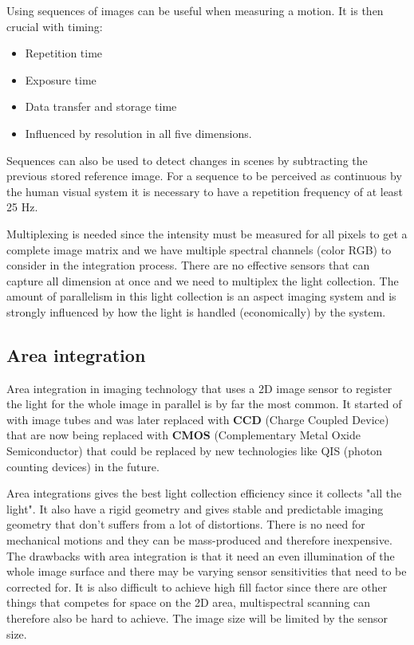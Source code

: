 Using sequences of images can be useful when measuring a motion. It is then crucial with timing:
\begin{itemize}
 	\item Repetition time
 	\item Exposure time
 	\item Data transfer and storage time
 	\item Influenced by resolution in all five dimensions. 
 \end{itemize} 
Sequences can also be used to detect changes in scenes by subtracting the previous stored reference image. For a sequence to be perceived as continuous by the human visual system it is necessary to have a repetition frequency of at least 25 Hz.

Multiplexing is needed since the intensity must be measured for all pixels to get a complete image matrix and we have multiple spectral channels (color RGB) to consider in the integration process. There are no effective sensors that can capture all dimension at once and we need to multiplex the light collection. The amount of parallelism in this light collection is an aspect imaging system and is strongly influenced by how the light is handled (economically) by the system. 

\subsection*{Area integration}
Area integration in imaging technology that uses a 2D image sensor to register the light for the whole image in parallel is by far the most common. It started of with image tubes and was later replaced with \textbf{CCD} (Charge Coupled Device) that are now being replaced with \textbf{CMOS} (Complementary Metal Oxide Semiconductor) that could be replaced by new technologies like QIS (photon counting devices) in the future. 

Area integrations gives the best light collection efficiency since it collects "all the light". It also have a rigid geometry and gives stable and predictable imaging geometry that don't suffers from a lot of distortions. There is no need for mechanical motions and they can be mass-produced and therefore inexpensive. The drawbacks with area integration is that it need an even illumination of the whole image surface and there may be varying sensor sensitivities that need to be corrected for. It is also difficult to achieve high fill factor since there are other things that competes for space on the 2D area, multispectral scanning can therefore also be hard to achieve. The image size will be limited by the sensor size. 

